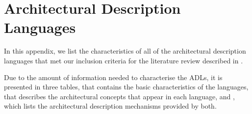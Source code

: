 \chapter{Architectural Description Languages} \label{appendix:adl-list}
In this appendix, we list the characteristics of all of the architectural description languages that met our inclusion criteria for the literature review described in .

Due to the amount of information needed to characterise the ADLs, it is presented in three tables,  that contains the basic characteristics of the languages,  that describes the architectural concepts that appear in each language, and , which lists the architectural description mechanisms provided by both.

